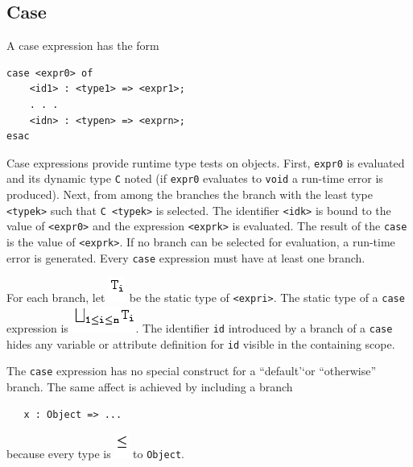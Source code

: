 \documentclass[]{article}
\begin{document}
\subsection{Case}

A case expression has the form

\begin{verbatim}
case <expr0> of 
    <id1> : <type1> => <expr1>; 
    . . .
    <idn> : <typen> => <exprn>; 
esac
\end{verbatim}

Case expressions provide runtime type tests on objects. First,
\texttt{expr0} is evaluated and its dynamic type \texttt{C} noted (if
\texttt{expr0} evaluates to \texttt{void} a run-time error is produced).
Next, from among the branches the branch with the least type
\texttt{\textless{}typek\textgreater{}} such that
\texttt{C  \textless{}typek\textgreater{}} is selected. The identifier
\texttt{\textless{}idk\textgreater{}} is bound to the value of
\texttt{\textless{}expr0\textgreater{}} and the expression
\texttt{\textless{}exprk\textgreater{}} is evaluated. The result of the
\texttt{case} is the value of \texttt{\textless{}exprk\textgreater{}}.
If no branch can be selected for evaluation, a run-time error is
generated. Every \texttt{case} expression must have at least one branch.

For each branch, let \includegraphics{img25.png} be the static type of
\texttt{\textless{}expri\textgreater{}}. The static type of a
\texttt{case} expression is \includegraphics{img26.png}. The identifier
\texttt{id} introduced by a branch of a \texttt{case} hides any variable
or attribute definition for \texttt{id} visible in the containing scope.

The \texttt{case} expression has no special construct for a
``default'`or ``otherwise'' branch. The same affect is achieved by
including a branch

\begin{verbatim}
   x : Object => ...
\end{verbatim}

because every type is \includegraphics{img22.png} to \texttt{Object}.
\end{document}
